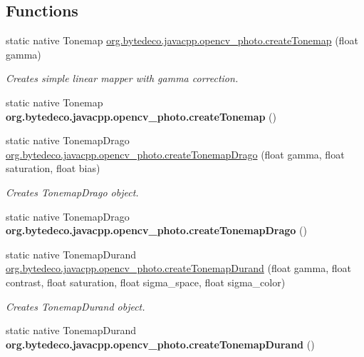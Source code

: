 \subsection*{Functions}
\begin{DoxyCompactItemize}
\item 
static native Tonemap \hyperlink{group__photo__hdr_gafe2ea9dc47d0ec1d3a5ec361ab19de32}{org.\+bytedeco.\+javacpp.\+opencv\+\_\+photo.\+create\+Tonemap} (float gamma)
\begin{DoxyCompactList}\small\item\em Creates simple linear mapper with gamma correction. \end{DoxyCompactList}\item 
\mbox{\label{group__photo__hdr_ga44865a523459a4a68bc338e73682f382}} 
static native Tonemap {\bfseries org.\+bytedeco.\+javacpp.\+opencv\+\_\+photo.\+create\+Tonemap} ()
\item 
static native Tonemap\+Drago \hyperlink{group__photo__hdr_ga1850aec7f1cd1ea1bde49da2093275cd}{org.\+bytedeco.\+javacpp.\+opencv\+\_\+photo.\+create\+Tonemap\+Drago} (float gamma, float saturation, float bias)
\begin{DoxyCompactList}\small\item\em Creates Tonemap\+Drago object. \end{DoxyCompactList}\item 
\mbox{\label{group__photo__hdr_ga96cb07c9dca4e434c223a104ecd3f532}} 
static native Tonemap\+Drago {\bfseries org.\+bytedeco.\+javacpp.\+opencv\+\_\+photo.\+create\+Tonemap\+Drago} ()
\item 
static native Tonemap\+Durand \hyperlink{group__photo__hdr_ga797e4fa1a099e588d6ec45b1c87a772a}{org.\+bytedeco.\+javacpp.\+opencv\+\_\+photo.\+create\+Tonemap\+Durand} (float gamma, float contrast, float saturation, float sigma\+\_\+space, float sigma\+\_\+color)
\begin{DoxyCompactList}\small\item\em Creates Tonemap\+Durand object. \end{DoxyCompactList}\item 
\mbox{\label{group__photo__hdr_ga4d57eb69aeb9cd88588e55340e9a0be4}} 
static native Tonemap\+Durand {\bfseries org.\+bytedeco.\+javacpp.\+opencv\+\_\+photo.\+create\+Tonemap\+Durand} ()
\item 

\end{DoxyCompactItemize}
